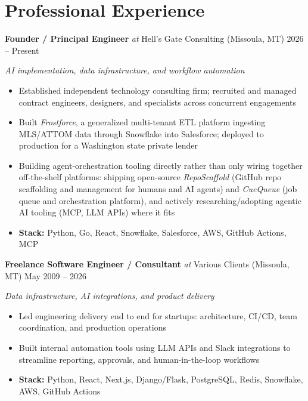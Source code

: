 \documentclass[10pt]{article}
\newcommand{\roleline}[4]{%
  \noindent\textbf{#1} \textit{at} #2 #3 \hfill #4\par
}
\begin{document}
\section*{Professional Experience}


\roleline{Founder / Principal Engineer}{Hell's Gate Consulting}{(Missoula, MT)}{2026 -- Present}
\emph{AI implementation, data infrastructure, and workflow automation}\par
\begin{itemize}
  \item Established independent technology consulting firm; recruited and managed contract engineers, designers, and specialists across concurrent engagements
  \item Built \textit{Frostforce}, a generalized multi-tenant ETL platform ingesting MLS/ATTOM data through Snowflake into Salesforce; deployed to production for a Washington state private lender
  \item Building agent-orchestration tooling directly rather than only wiring together off-the-shelf platforms: shipping open-source \textit{RepoScaffold} (GitHub repo scaffolding and management for humans and AI agents) and \textit{CueQueue} (job queue and orchestration platform), and actively researching/adopting agentic AI tooling (MCP, LLM APIs) where it fits
  \item \textbf{Stack:} Python, Go, React, Snowflake, Salesforce, AWS, GitHub Actions, MCP
\end{itemize}


\roleline{Freelance Software Engineer / Consultant}{Various Clients}{(Missoula, MT)}{May 2009 -- 2026}
\emph{Data infrastructure, AI integrations, and product delivery}\par
\begin{itemize}
  \item Led engineering delivery end to end for startups: architecture, CI/CD, team coordination, and production operations
  \item Built internal automation tools using LLM APIs and Slack integrations to streamline reporting, approvals, and human-in-the-loop workflows
  \item \textbf{Stack:} Python, React, Next.js, Django/Flask, PostgreSQL, Redis, Snowflake, AWS, GitHub Actions
\end{itemize}
\end{document}
